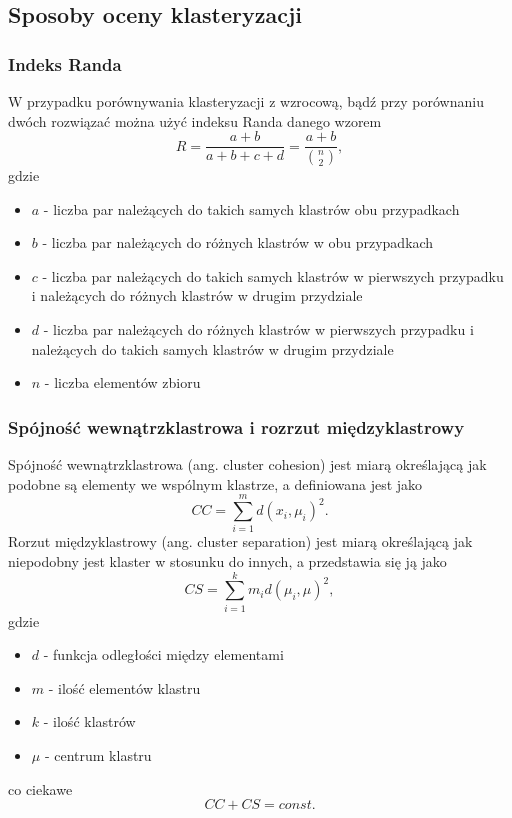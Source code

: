 \subsection{Sposoby oceny klasteryzacji}

\subsubsection{Indeks Randa}
W przypadku porównywania klasteryzacji z wzrocową, bądź przy porównaniu dwóch rozwiązać można użyć indeksu Randa danego wzorem
\begin{equation}
R=\frac{a+b}{a+b+c+d}=\frac{a+b}{\binom{n}{2}},
\end{equation}
gdzie
\begin{itemize}
\item $a$ - liczba par należących do takich samych klastrów obu przypadkach
\item $b$ - liczba par należących do różnych klastrów w obu przypadkach
\item $c$ - liczba par należących do takich samych klastrów w pierwszych przypadku i należących do różnych klastrów w drugim przydziale
\item $d$ - liczba par należących do różnych klastrów w pierwszych przypadku i należących do takich samych klastrów w drugim przydziale
\item $n$ - liczba elementów zbioru
\end{itemize}

\subsubsection{Spójność wewnątrzklastrowa i rozrzut międzyklastrowy}
Spójność wewnątrzklastrowa (ang. cluster cohesion) jest miarą określającą jak podobne są elementy we wspólnym klastrze, a definiowana jest jako
\begin{equation}
CC = \displaystyle \sum_{i=1}^{m} d(x_i, \mu_i)^2.
\end{equation}
Rorzut międzyklastrowy (ang. cluster separation) jest miarą określającą jak niepodobny jest klaster w stosunku do innych, a przedstawia się ją jako
\begin{equation}
CS = \displaystyle \sum_{i=1}^{k} m_i d(\mu_i, \mu)^2,
\end{equation}
gdzie
\begin{itemize}
\item $d$ - funkcja odległości między elementami
\item $m$ - ilość elementów klastru
\item $k$ - ilość klastrów
\item $\mu$ - centrum klastru
\end{itemize}
co ciekawe
\begin{equation}
CC + CS = const.
\end{equation}

